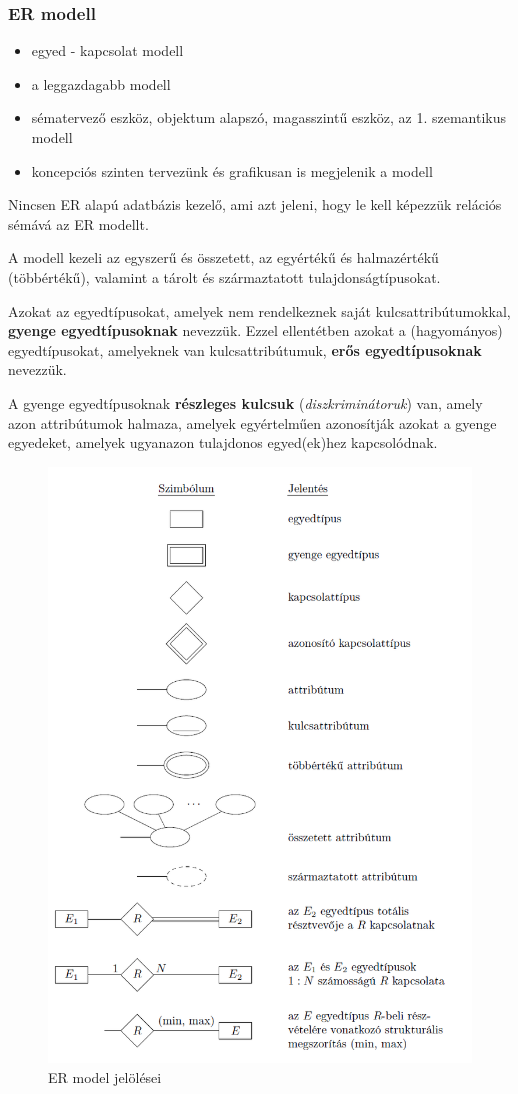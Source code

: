\subsubsection{ER modell}
\begin{itemize}[nosep]
	\item egyed - kapcsolat modell
	\item a leggazdagabb modell
	\item sématervező eszköz, objektum alapszó, magasszintű eszköz, az 1. szemantikus modell
	\item koncepciós szinten tervezünk és grafikusan is megjelenik a modell
\end{itemize}
\begin{note}
Nincsen ER alapú adatbázis kezelő, ami azt jeleni, hogy le kell képezzük relációs sémává az ER modellt.
\end{note}
A modell kezeli az egyszerű és összetett, az egyértékű és halmazértékű (többértékű), valamint a tárolt és származtatott tulajdonságtípusokat.
\begin{definition}[Egyedtípusok]
	Azokat az egyedtípusokat, amelyek nem rendelkeznek saját kulcsattribútumokkal, \textbf{gyenge egyedtípusoknak} nevezzük. Ezzel ellentétben azokat a (hagyományos) egyedtípusokat, 	amelyeknek van kulcsattribútumuk, \textbf{erős egyedtípusoknak} nevezzük.
\end{definition}
\begin{definition}
	A gyenge egyedtípusoknak \textbf{részleges kulcsuk} (\emph{diszkriminátoruk}) van, amely azon attribútumok halmaza, amelyek egyértelműen azonosítják azokat a gyenge egyedeket, amelyek ugyanazon tulajdonos egyed(ek)hez kapcsolódnak.
\end{definition}
\begin{figure}[h]
	\centering
	\includegraphics[width=0.7\linewidth]{fig/6-ER_symbols}
	\caption{ER model jelölései}
	\label{fig:6-ersymbols}
\end{figure}
